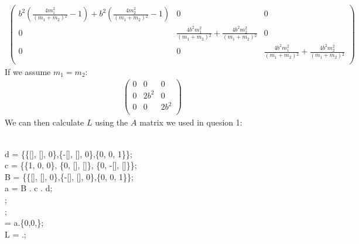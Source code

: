 \documentclass[10pt]{article}
\begin{document}
\begin{enumerate}
\begin{enumerate}
{      }
      \begin{gather*}
        \left(
        \begin{array}{ccc}
          b^2 \left(\frac{4 m_1^2}{\left(m_1+m_2\right){}^2}-1\right)+b^2 \left(\frac{4 m_2^2}{\left(m_1+m_2\right){}^2}-1\right) & 0 & 0 \\
          0                                                                                                                       & \frac{4 b^2 m_1^2}{\left(m_1+m_2\right){}^2}+\frac{4 b^2 m_2^2}{\left(m_1+m_2\right){}^2} & 0 \\
          0                                                                                                                       & 0                                                                                         & \frac{4 b^2 m_1^2}{\left(m_1+m_2\right){}^2}+\frac{4 b^2 m_2^2}{\left(m_1+m_2\right){}^2} \\
        \end{array}
        \right)
      \end{gather*}
      If we assume $m_1=m_2$:
      \begin{gather*}
        \left(
        \begin{array}{ccc}
          0 & 0     & 0     \\
          0 & 2 b^2 & 0     \\
          0 & 0     & 2 b^2 \\
        \end{array}
        \right)
      \end{gather*}
      We can then calculate $L$ using the $A$ matrix we used in quesion 1:\\
      \\
      \parbox{\textwidth}{
        d = \{\{[\phi ], [\phi ], 0\},\{-[\phi ], [\phi ], 0\},\{0, 0, 1\}\};\\
        c = \{\{1, 0, 0\}, \{0, [\theta ], [\theta ]\}, \{0, -[\theta ], [\theta ]\}\};\\
        B = \{\{[\psi ], [\psi ], 0\},\{-[\psi ], [\psi ], 0\},\{0, 0, 1\}\};\\
        a = B . c . d;\\
        ;\\
        ;\\
         = a.\{0,0,\omega \};\\
        L = .;\\
}
\end{enumerate}
\end{enumerate}
\end{document}
